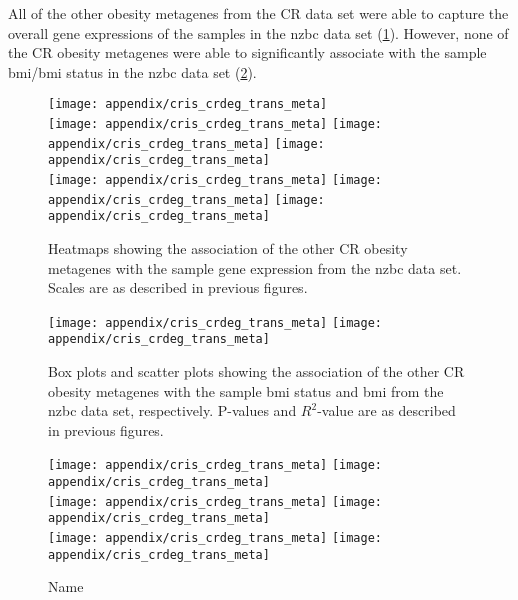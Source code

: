 \begin{appendices}
	All of the other obesity metagenes from the CR data set were able to capture the overall gene expressions of the samples in the \gls{nzbc} data set (\cref{fig:appendix/cr_ob_meta_heatmap_cris}).
	However, none of the CR obesity metagenes were able to significantly associate with the sample \gls{bmi}/\gls{bmi} status in the \gls{nzbc} data set (\cref{fig:appendix/cr_ob_meta_box_scatter_cris}).

	\begin{figure}[htp!]
		\centering
		\texttt{[image: appendix/cris\_crdeg\_trans\_meta]}\\
		\texttt{[image: appendix/cris\_crdeg\_trans\_meta]}
		\texttt{[image: appendix/cris\_crdeg\_trans\_meta]}
		\texttt{[image: appendix/cris\_crdeg\_trans\_meta]}\\
		\texttt{[image: appendix/cris\_crdeg\_trans\_meta]}
		\texttt{[image: appendix/cris\_crdeg\_trans\_meta]}
		\texttt{[image: appendix/cris\_crdeg\_trans\_meta]}\\
		\caption{Heatmaps showing the association of the other CR obesity metagenes with the sample gene expression from the \gls{nzbc} data set.
	Scales are as described in previous figures.}
		\label{fig:appendix/cr_ob_meta_heatmap_cris}
	\end{figure}

	\begin{figure}[htpb]
		\centering
		\texttt{[image: appendix/cris\_crdeg\_trans\_meta]}
		\hfill
		\texttt{[image: appendix/cris\_crdeg\_trans\_meta]}\\
		\caption{Box plots and scatter plots showing the association of the other CR obesity metagenes with the sample \gls{bmi} status  and \gls{bmi} from the \gls{nzbc} data set, respectively.
	P-values and $R^2$-value are as described in previous figures.}
		\label{fig:appendix/cr_ob_meta_box_scatter_cris}
	\end{figure}

	\begin{figure}[htpb]
		\ContinuedFloat
		\captionsetup{list=off,format=cont}
		\centering
		\texttt{[image: appendix/cris\_crdeg\_trans\_meta]}
		\hfill
		\texttt{[image: appendix/cris\_crdeg\_trans\_meta]}\\
		\texttt{[image: appendix/cris\_crdeg\_trans\_meta]}
		\hfill
		\texttt{[image: appendix/cris\_crdeg\_trans\_meta]}\\
		\texttt{[image: appendix/cris\_crdeg\_trans\_meta]}
		\hfill
		\texttt{[image: appendix/cris\_crdeg\_trans\_meta]}\\
		\caption{Name}
	\end{figure}


\end{appendices}
